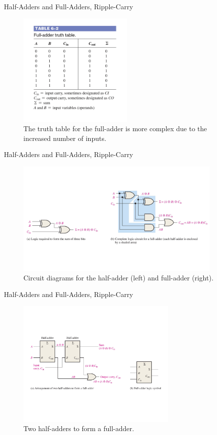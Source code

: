 \documentclass{beamer}
\begin{document}
\begin{frame}{Half-Adders and Full-Adders, Ripple-Carry}
\begin{figure}
\centering
\includegraphics[width=0.5\textwidth]{figures/adder5.pdf}
\caption{\label{fig:add5} The truth table for the full-adder is more complex due to the increased number of inputs.}
\end{figure}
\end{frame}

\begin{frame}{Half-Adders and Full-Adders, Ripple-Carry}
\begin{figure}
\centering
\includegraphics[width=0.9\textwidth]{figures/adder6.pdf}
\caption{\label{fig:add6} Circuit diagrams for the half-adder (left) and full-adder (right).}
\end{figure}
\end{frame}

\begin{frame}{Half-Adders and Full-Adders, Ripple-Carry}
\begin{figure}
\centering
\includegraphics[width=0.7\textwidth]{figures/adder7.pdf}
\caption{\label{fig:add7} Two half-adders to form a full-adder.}
\end{figure}
\end{frame}
\end{document}
